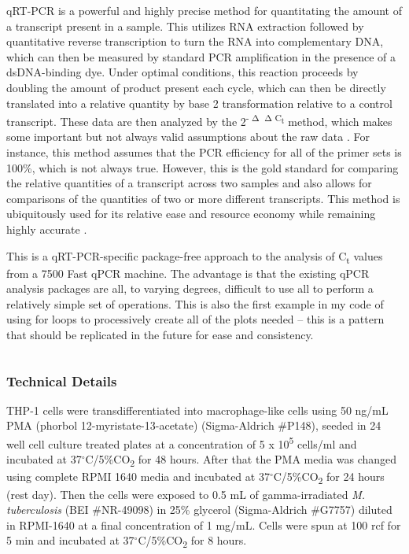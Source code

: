 qRT\hyp{}PCR is a powerful and highly precise method for quantitating the amount of a transcript present in a sample. This utilizes RNA extraction followed by quantitative reverse transcription to turn the RNA into complementary DNA, which can then be measured by standard PCR amplification in the presence of a dsDNA\hyp{}binding dye. Under optimal conditions, this reaction proceeds by doubling the amount of product present each cycle, which can then be directly translated into a relative quantity by base 2 transformation relative to a control transcript. These data are then analyzed by the 2\textsuperscript{\hyp{}$\upDelta\upDelta$C\textsubscript{t}} method, which makes some important but not always valid assumptions about the raw data \citep{Livak2001, Cikos2007}. For instance, this method assumes that the PCR efficiency for all of the primer sets is 100\%, which is not always true. However, this is the gold standard for comparing the relative quantities of a transcript across two samples and also allows for comparisons of the quantities of two or more different transcripts. This method is ubiquitously used for its relative ease and resource economy while remaining highly accurate \citep{Dvinge2009, Perkins2012, Pabinger2014}.

\begin{code}
\caption{This is a qRT\hyp{}PCR\hyp{}specific package\hyp{}free approach to the analysis of C\textsubscript{t} values from a 7500 Fast qPCR machine. The advantage is that the existing qPCR analysis packages are all, to varying degrees, difficult to use all to perform a relatively simple set of operations. This is also the first example in my code of using for loops to processively create all of the plots needed -- this is a pattern that should be replicated in the future for ease and consistency.}
\label{qpcranalysis}

\inputminted[breaklines,frame=single,fontsize=\small]{r}{source/qPCR_analysis.R}

\end{code}

\subsubsection{Technical Details}\label{rnaextraction}

THP\hyp{}1 cells were transdifferentiated into macrophage\hyp{}like cells using 50 ng/mL PMA (phorbol 12\hyp{}myristate\hyp{}13\hyp{}acetate) (Sigma\hyp{}Aldrich \#P148), seeded in 24 well cell culture treated plates at a concentration of 5 x 10\textsuperscript{5} cells/ml and incubated at 37$^{\circ}$C/5\%CO\textsubscript{2} for 48 hours. After that the PMA media was changed using complete RPMI 1640 media and incubated at 37$^{\circ}$C/5\%CO\textsubscript{2} for 24 hours (rest day). Then the cells were exposed to 0.5 mL of gamma\hyp{}irradiated \textit{M. tuberculosis} (BEI \#NR\hyp{}49098) in 25\% glycerol (Sigma\hyp{}Aldrich \#G7757) diluted in RPMI\hyp{}1640 at a final concentration of 1 mg/mL. Cells were spun at 100 rcf for 5 min and incubated at 37$^{\circ}$C/5\%CO\textsubscript{2} for 8 hours.

